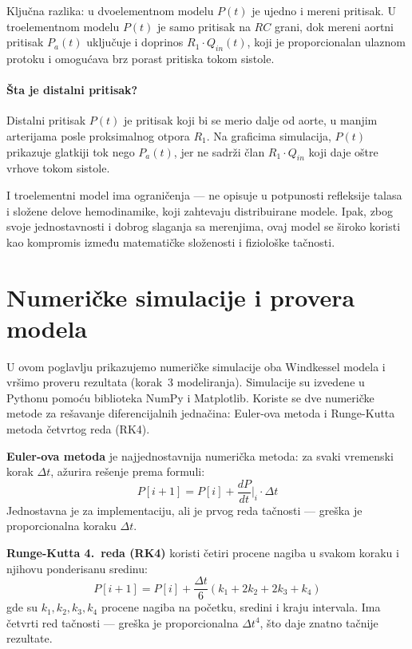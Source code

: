 \documentclass[12pt,a4paper]{article}
\begin{document}
Ključna razlika: u dvoelementnom modelu $P(t)$ je ujedno i mereni pritisak. U troelementnom modelu $P(t)$ je samo pritisak na $RC$ grani, dok mereni aortni pritisak $P_a(t)$ uključuje i doprinos $R_1 \cdot Q_{in}(t)$, koji je proporcionalan ulaznom protoku i omogućava brz porast pritiska tokom sistole.

\paragraph{Šta je distalni pritisak?}
Distalni pritisak $P(t)$ je pritisak koji bi se merio dalje od aorte, u manjim arterijama posle proksimalnog otpora $R_1$. Na graficima simulacija, $P(t)$ prikazuje glatkiji tok nego $P_a(t)$, jer ne sadrži član $R_1 \cdot Q_{in}$ koji daje oštre vrhove tokom sistole.

I troelementni model ima ograničenja --- ne opisuje u potpunosti refleksije talasa i složene delove hemodinamike, koji zahtevaju distribuirane modele. Ipak, zbog svoje jednostavnosti i dobrog slaganja sa merenjima, ovaj model se široko koristi kao kompromis između matematičke složenosti i fiziološke tačnosti.


\section{Numeričke simulacije i provera modela}

U ovom poglavlju prikazujemo numeričke simulacije oba Windkessel modela i vršimo proveru rezultata (korak~3 modeliranja). Simulacije su izvedene u Pythonu pomoću biblioteka NumPy i Matplotlib. Koriste se dve numeričke metode za rešavanje diferencijalnih jednačina: Euler-ova metoda i Runge-Kutta metoda četvrtog reda (RK4).

\textbf{Euler-ova metoda} je najjednostavnija numerička metoda: za svaki vremenski korak $\Delta t$, ažurira rešenje prema formuli:
\begin{equation}
    P[i+1] = P[i] + \frac{dP}{dt}\bigg|_i \cdot \Delta t
\end{equation}
Jednostavna je za implementaciju, ali je prvog reda tačnosti --- greška je proporcionalna koraku $\Delta t$.

\textbf{Runge-Kutta 4.\ reda (RK4)} koristi četiri procene nagiba u svakom koraku i njihovu ponderisanu sredinu:
\begin{equation}
    P[i+1] = P[i] + \frac{\Delta t}{6}(k_1 + 2k_2 + 2k_3 + k_4)
\end{equation}
gde su $k_1, k_2, k_3, k_4$ procene nagiba na početku, sredini i kraju intervala. Ima četvrti red tačnosti --- greška je proporcionalna $\Delta t^4$, što daje znatno tačnije rezultate.
\end{document}
